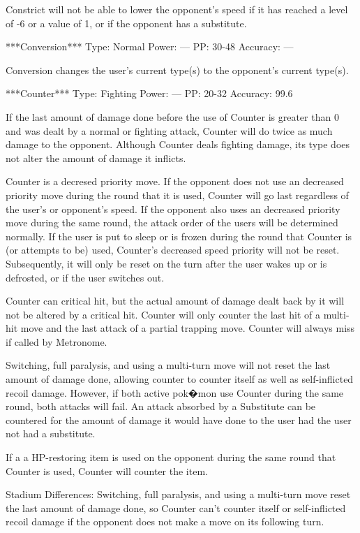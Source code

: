 \documentclass[reprint, aps, prl, paper=A4]{revtex4-1}
\begin{document}
Constrict will not be able to lower the opponent's speed if it has reached a level of -6 or a
value of 1, or if the opponent has a substitute.


***Conversion***
Type: Normal
Power: ---
PP: 30-48
Accuracy: ---

Conversion changes the user's current type(s) to the opponent's current type(s).


***Counter***
Type: Fighting
Power: ---
PP: 20-32
Accuracy: 99.6%

If the last amount of damage done before the use of Counter is greater than 0 and was dealt by
a normal or fighting attack, Counter will do twice as much damage to the opponent. Although
Counter deals fighting damage, its type does not alter the amount of damage it inflicts.

Counter is a decresed priority move. If the opponent does not use an decreased priority move
during the round that it is used, Counter will go last regardless of the user's or opponent's
speed. If the opponent also uses an decreased priority move during the same round, the attack
order of the users will be determined normally. If the user is put to sleep or is frozen during
the round that Counter is (or attempts to be) used, Counter's decreased speed priority will not
be reset. Subsequently, it will only be reset on the turn after the user wakes up or is
defrosted, or if the user switches out.

Counter can critical hit, but the actual amount of damage dealt back by it will not be altered
by a critical hit. Counter will only counter the last hit of a multi-hit move and the last
attack of a partial trapping move. Counter will always miss if called by Metronome.

Switching, full paralysis, and using a multi-turn move will not reset the last amount of damage
done, allowing counter to counter itself as well as self-inflicted recoil damage. However, if
both active pok�mon use Counter during the same round, both attacks will fail. An attack
absorbed by a Substitute can be countered for the amount of damage it would have done to the
user had the user not had a substitute.

If a a HP-restoring item is used on the opponent during the same round that Counter is used,
Counter will counter the item.

Stadium Differences:
Switching, full paralysis, and using a multi-turn move reset the last amount of damage done, so
Counter can't counter itself or self-inflicted recoil damage if the opponent does not make a
move on its following turn.
\end{document}
